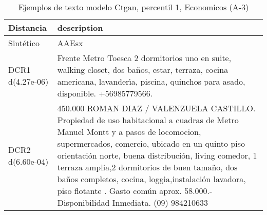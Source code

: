 \begin{table}[H]
\centering
\fontsize{10}{14}\selectfont
\caption{Ejemplos de texto modelo Ctgan, percentil 1, Economicos (A-3)}
\label{table-example-economicos-a-3-ctgan-1p-text}
\begin{tabular}{|l|m{35em}|}
\hline
\rowcolor[gray]{0.8}
Distancia & description \\
\hline Sintético & AAEsx \\
\hline DCR1 d(4.27e-06) & Frente Metro Toesca 2 dormitorios uno en suite, walking closet, dos ba\~nos, estar, terraza, cocina americana, lavander{\'\i}a, piscina, quinchos para asado, disponible. +56985779566. \\
\hline DCR2 d(6.60e-04) & 450.000 ROMAN DIAZ / VALENZUELA CASTILLO. Propiedad de uso habitacional a cuadras de Metro Manuel Montt y a pasos de locomocion, supermercados, comercio, ubicado en un quinto piso orientaci\'on norte, buena distribuci\'on, living comedor, 1 terraza amplia,2 dormitorios de buen tama\~no, dos ba\~nos completos, cocina, loggia,instalaci\'on lavadora, piso flotante . Gasto com\'un aprox. 58.000.- Disponibilidad Inmediata. (09) 984210633 \\
\hline
\end{tabular}
\end{table}
